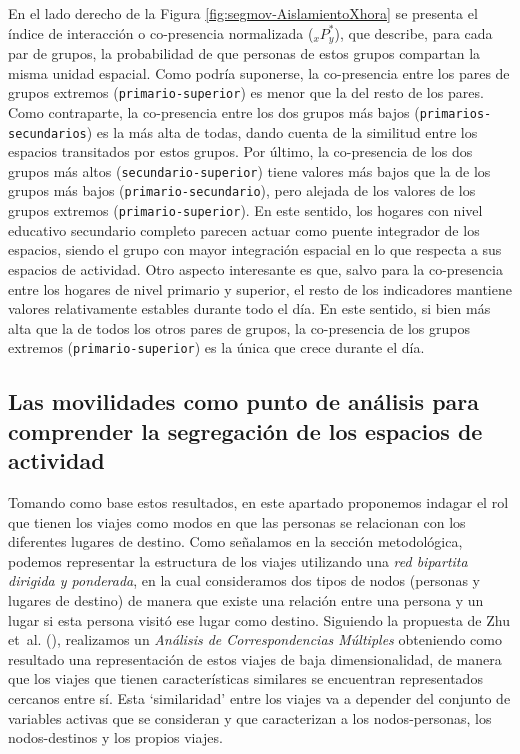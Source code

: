 \documentclass[
  spanish,
  a4paper,%
  chapterprefix=true,%
  DIV=calc,%
  twoside]{scrbook}%
\newcommand{\passthrough}[1]{#1}
\begin{document}
En el lado derecho de la Figura \ref{fig:segmov-AislamientoXhora} se
presenta el índice de interacción o co-presencia normalizada
(\(_xP_y^*\)), que describe, para cada par de grupos, la probabilidad de
que personas de estos grupos compartan la misma unidad espacial. Como
podría suponerse, la co-presencia entre los pares de grupos extremos
(\passthrough{\lstinline!primario-superior!}) es menor que la del resto de los pares. Como
contraparte, la co-presencia entre los dos grupos más bajos
(\passthrough{\lstinline!primarios-secundarios!}) es la más alta de todas, dando cuenta de la
similitud entre los espacios transitados por estos grupos. Por último,
la co-presencia de los dos grupos más altos (\passthrough{\lstinline!secundario-superior!})
tiene valores más bajos que la de los grupos más bajos
(\passthrough{\lstinline!primario-secundario!}), pero alejada de los valores de los grupos
extremos (\passthrough{\lstinline!primario-superior!}). En este sentido, los hogares con nivel
educativo secundario completo parecen actuar como puente integrador de
los espacios, siendo el grupo con mayor integración espacial en lo que
respecta a sus espacios de actividad. Otro aspecto interesante es que,
salvo para la co-presencia entre los hogares de nivel primario y
superior, el resto de los indicadores mantiene valores relativamente
estables durante todo el día. En este sentido, si bien más alta que la
de todos los otros pares de grupos, la co-presencia de los grupos
extremos (\passthrough{\lstinline!primario-superior!}) es la única que crece durante el día.

\subsection*{Las movilidades como punto de análisis para comprender la segregación de los espacios de actividad}\label{las-movilidades-como-punto-de-anuxe1lisis-para-comprender-la-segregaciuxf3n-de-los-espacios-de-actividad}

Tomando como base estos resultados, en este apartado proponemos indagar
el rol que tienen los viajes como modos en que las personas se
relacionan con los diferentes lugares de destino. Como señalamos en la
sección metodológica, podemos representar la estructura de los viajes
utilizando una \emph{red bipartita dirigida y ponderada}, en la cual
consideramos dos tipos de nodos (personas y lugares de destino) de
manera que existe una relación entre una persona y un lugar si esta
persona visitó ese lugar como destino. Siguiendo la propuesta de
Zhu et~al. (), realizamos un \emph{Análisis de Correspondencias Múltiples}
obteniendo como resultado una representación de estos viajes de baja
dimensionalidad, de manera que los viajes que tienen características
similares se encuentran representados cercanos entre sí. Esta
`similaridad' entre los viajes va a depender del conjunto de variables
activas que se consideran y que caracterizan a los nodos-personas, los
nodos-destinos y los propios viajes.
\end{document}
